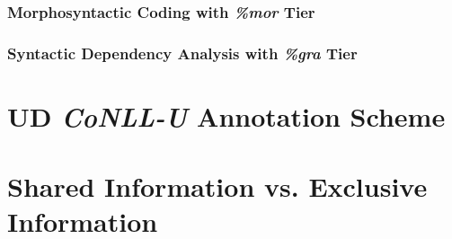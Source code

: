 \subsubsection{Morphosyntactic Coding with \emph{\%mor} Tier}

\subsubsection{Syntactic Dependency Analysis with \emph{\%gra} Tier}

\section{UD \emph{CoNLL-U} Annotation Scheme}

\section{Shared Information vs. Exclusive Information}
